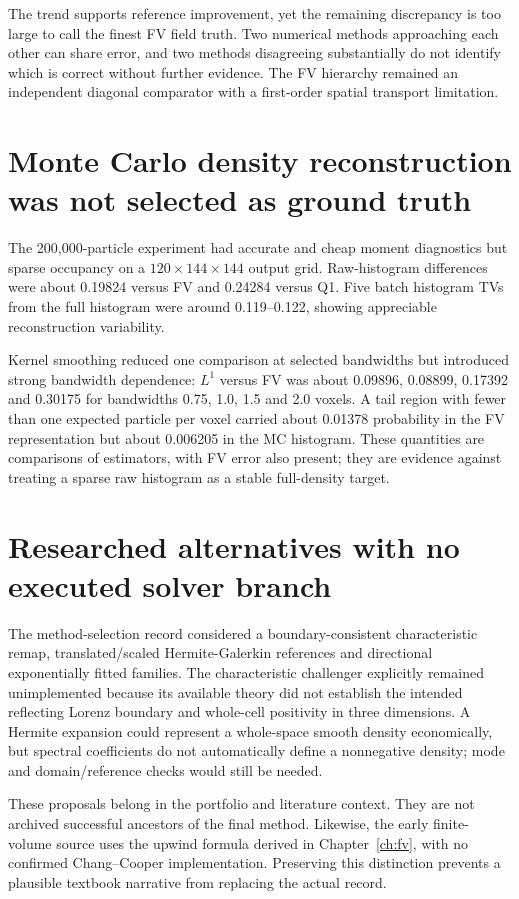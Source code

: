 The trend supports reference improvement, yet the remaining discrepancy is too large to call the finest FV field truth. Two numerical methods approaching each other can share error, and two methods disagreeing substantially do not identify which is correct without further evidence. The FV hierarchy remained an independent diagonal comparator with a first-order spatial transport limitation.

\section{Monte Carlo density reconstruction was not selected as ground truth}
The 200,000-particle experiment had accurate and cheap moment diagnostics but sparse occupancy on a $120\times144\times144$ output grid. Raw-histogram differences were about 0.19824 versus FV and 0.24284 versus Q1. Five batch histogram TVs from the full histogram were around 0.119--0.122, showing appreciable reconstruction variability.

Kernel smoothing reduced one comparison at selected bandwidths but introduced strong bandwidth dependence: $L^1$ versus FV was about 0.09896, 0.08899, 0.17392 and 0.30175 for bandwidths 0.75, 1.0, 1.5 and 2.0 voxels. A tail region with fewer than one expected particle per voxel carried about 0.01378 probability in the FV representation but about 0.006205 in the MC histogram. These quantities are comparisons of estimators, with FV error also present; they are evidence against treating a sparse raw histogram as a stable full-density target.

\section{Researched alternatives with no executed solver branch}
The method-selection record considered a boundary-consistent characteristic remap, translated/scaled Hermite-Galerkin references and directional exponentially fitted families. The characteristic challenger explicitly remained unimplemented because its available theory did not establish the intended reflecting Lorenz boundary and whole-cell positivity in three dimensions. A Hermite expansion could represent a whole-space smooth density economically, but spectral coefficients do not automatically define a nonnegative density; mode and domain/reference checks would still be needed.

These proposals belong in the portfolio and literature context. They are not archived successful ancestors of the final method. Likewise, the early finite-volume source uses the upwind formula derived in Chapter~\ref{ch:fv}, with no confirmed Chang--Cooper implementation. Preserving this distinction prevents a plausible textbook narrative from replacing the actual record.

